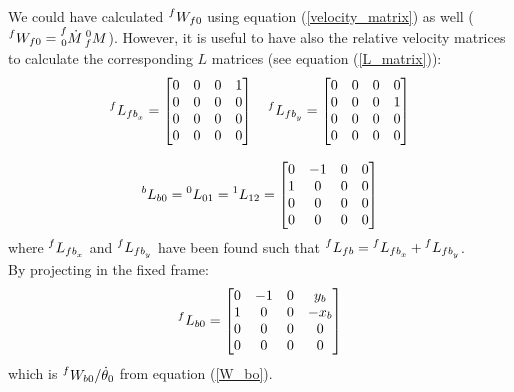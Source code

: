 \documentclass[a4paper,12pt,oneside]{report}
\begin{document}
\\
We could have calculated $\prescript{f}{}{W_{f0}}$ using equation (\ref{velocity_matrix}) as well ($\prescript{f}{}{W_{f0}}=\prescript{f}{0}{\dot{M}}\prescript{0}{f}{M}$). However, it is useful to have also the relative velocity matrices to calculate the corresponding $L$ matrices (see equation (\ref{L_matrix})):
\begin{equation}
  \begin{array}{c}
    \prescript{f}{}{L_{{fb}_x}}=\begin{bmatrix}
      0&0&0&1\\
      0&0&0&0\\
      0&0&0&0\\
      0&0&0&0
    \end{bmatrix} \quad
    \prescript{f}{}{L_{{fb}_y}}=\begin{bmatrix}
      0&0&0&0\\
      0&0&0&1\\
      0&0&0&0\\
      0&0&0&0
    \end{bmatrix}\\ \\
    \prescript{b}{}{L_{b0}}=\prescript{0}{}{L_{01}}=\prescript{1}{}{L_{12}}=\begin{bmatrix}
      0&-1&0&0\\
      1&0&0&0\\
      0&0&0&0\\
      0&0&0&0
    \end{bmatrix}
  \end{array}
  \label{L_matrices}
\end{equation}
where $\prescript{f}{}{L_{{fb}_x}}$ and $\prescript{f}{}{L_{{fb}_y}}$ have been found such that $\prescript{f}{}{L_{fb}}=\prescript{f}{}{L_{{fb}_x}}+\prescript{f}{}{L_{{fb}_y}}$.\\
By projecting in the fixed frame:
\begin{equation}
  \prescript{f}{}{L_{b0}}=\begin{bmatrix}
    0&-1&0&y_b\\
    1&0&0&-x_b\\
    0&0&0&0\\
    0&0&0&0
  \end{bmatrix}
\end{equation}
which is $\prescript{f}{}{W_{b0}}/ \dot{\theta}_0$ from equation (\ref{W_bo}).
\newpage
\end{document}
